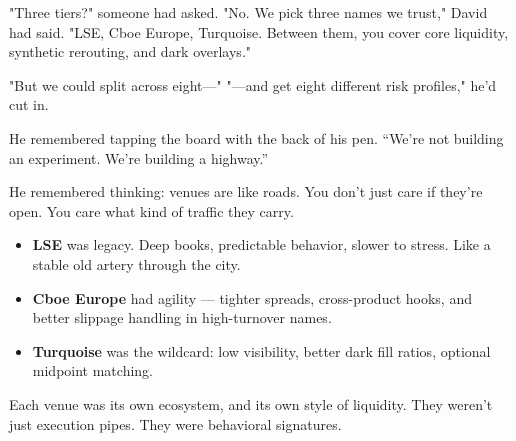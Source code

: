 "Three tiers?" someone had asked.
"No. We pick three names we trust," David had said.
"LSE, Cboe Europe, Turquoise. Between them, you cover core liquidity, synthetic rerouting, and dark overlays."

"But we could split across eight—"
"—and get eight different risk profiles," he’d cut in.

He remembered tapping the board with the back of his pen.
“We’re not building an experiment. We’re building a highway.”

He remembered thinking: venues are like roads.
You don’t just care if they’re open. You care what kind of traffic they carry.

\begin{itemize}
\item \textbf{LSE} was legacy. Deep books, predictable behavior, slower to stress. Like a stable old artery through the city.
\item \textbf{Cboe Europe} had agility — tighter spreads, cross-product hooks, and better slippage handling in high-turnover names.
\item \textbf{Turquoise} was the wildcard: low visibility, better dark fill ratios, optional midpoint matching.
\end{itemize}

Each venue was its own ecosystem, and its own style of liquidity.
They weren’t just execution pipes. They were behavioral signatures.



\medskip

